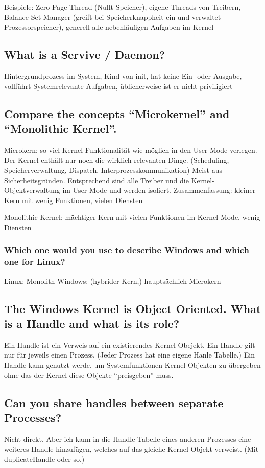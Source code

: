 Beispiele: Zero Page Thread (Nullt Speicher), eigene Threads von Treibern, Balance Set Manager (greift bei Speicherknappheit ein und verwaltet Prozessorspeicher), generell alle nebenläufigen Aufgaben im Kernel

\subsection{What is a Servive / Daemon?}
Hintergrundprozess im System, Kind von init, hat keine Ein- oder Ausgabe, vollführt Systemrelevante Aufgaben, üblicherweise ist er nicht-priviligiert

\subsection{Compare the concepts ``Microkernel'' and ``Monolithic Kernel''.}
Microkern: so viel Kernel Funktionalität wie möglich in den User Mode verlegen.
Der Kernel enthält nur noch die wirklich relevanten Dinge. (Scheduling, Speicherverwaltung, Dispatch, Interprozesskommunikation)
Meist aus Sicherheitsgründen.
Entsprechend sind alle Treiber und die Kernel-Objektverwaltung im User Mode und werden isoliert.
Zusammenfassung: kleiner Kern mit wenig Funktionen, vielen Diensten

Monolithic Kernel: mächtiger Kern mit vielen Funktionen im Kernel Mode, wenig Diensten

\subsubsection{Which one would you use to describe Windows and which one for Linux?}
Linux: Monolith
Windows: (hybrider Kern,) hauptsächlich Microkern

\subsection{The Windows Kernel is Object Oriented. What is a Handle and what is its role?}
Ein Handle ist ein Verweis auf ein existierendes Kernel Obejekt.
Ein Handle gilt nur für jeweils einen Prozess. (Jeder Prozess hat eine eigene Hanle Tabelle.)
Ein Handle kann genutzt werde, um Systemfunktionen Kernel Objekten zu übergeben ohne das der Kernel diese Objekte ``preisgeben'' muss.

\subsection{Can you share handles between separate Processes?}
Nicht direkt. Aber ich kann in die Handle Tabelle eines anderen Prozesses eine weiteres Handle hinzufügen, welches auf das gleiche Kernel Objekt verweist.
(Mit duplicateHandle oder so.)

